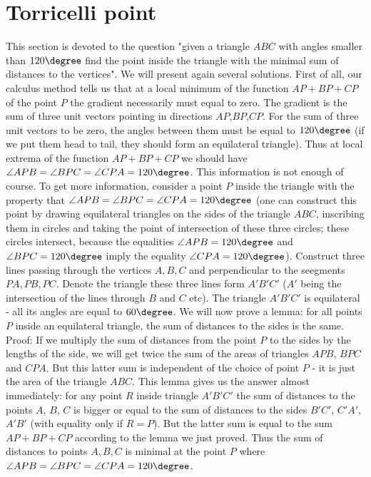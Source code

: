 \section{Torricelli point}
This section is devoted to the question "given a triangle $ABC$ with angles smaller than $120 \degree$ find the point inside the triangle with the minimal sum of distances to the vertices".
We will present again several solutions.
First of all, our calculus method tells us that at a local minimum of the function $AP+BP+CP$ of the point $P$ the gradient necessarily must equal to zero. The gradient is the sum of three unit vectors pointing in directions $AP$,$BP$,$CP$. For the sum of three unit vectors to be zero, the angles between them must be equal to $120\degree$ (if we put them head to tail, they should form an equilateral triangle). Thus at local extrema of the function $AP+BP+CP$ we should have $\angle APB=\angle BPC=\angle CPA=120 \degree$.
This information is not enough of course. To get more information, consider a point $P$ inside the triangle with the property that $\angle APB=\angle BPC = \angle CPA = 120\degree$ (one can construct this point by drawing equilateral triangles on the sides of the triangle $ABC$, inscribing them in circles and taking the point of intersection of these three circles; these circles intersect, because the equalities $\angle APB=120 \degree$ and $\angle BPC=120 \degree$ imply the equality $\angle CPA=120 \degree$). Construct three lines passing through the vertices $A,B,C$ and perpendicular to the seegments $PA,PB,PC$. Denote the triangle these three lines form $A'B'C'$ ($A'$ being the intersection of the lines through $B$ and $C$ etc). The triangle $A'B'C'$ is equilateral - all its angles are equal to $60 \degree$.
We will now prove a lemma: for all points $P$ inside an equilateral triangle, the sum of distances to the sides is the same.
Proof: If we multiply the sum of distances from the point $P$ to the sides by the lengths of the side, we will get twice the sum of the areas of triangles $APB$, $BPC$ and $CPA$. But this latter sum is independent of the choice of point $P$ - it is just the area of the triangle $ABC$.
This lemma gives us the answer almost immediately: for any point $R$ inside triangle $A'B'C'$ the sum of distances to the points $A$, $B$, $C$ is bigger or equal to the sum of distances to the sides $B'C'$, $C'A'$, $A'B'$ (with equality only if $R=P$). But the latter sum is equal to the sum $AP+BP+CP$ according to the lemma we just proved. Thus the sum of distances to points $A,B,C$ is minimal at the point $P$ where $\angle APB=\angle BPC = \angle CPA = 120\degree$.
